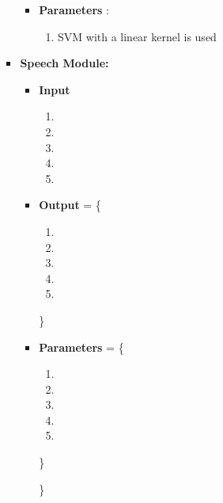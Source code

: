 \documentclass[oneside,a4paper,12pt]{report}
\begin{document}
\begin{normalsize}
\begin{itemize}
\begin{itemize}
\begin{itemize}
\begin{itemize}
			\item \textbf{Parameters} :
			\begin{enumerate}
			\item SVM with a linear kernel is used 
			\end{enumerate} 
		\end{itemize}
		\vspace{10mm}
		\item \textbf{Speech Module: }
	\begin{itemize}
		\item \textbf{Input} 
		\begin{enumerate}
			\item 
			\item
			\item
			\item
			\item
		\end{enumerate}
		
		\item \textbf{Output} = \{ 
		\begin{enumerate}
			\item 
			\item
			\item
			\item
			\item
		\end{enumerate}  \}
		
		\item \textbf{Parameters} = \{ 
		\begin{enumerate}
			\item 
			\item
			\item
			\item
			\item
		\end{enumerate}  \}
		
		\}
	\end{itemize}
	\end{itemize}
		

\end{itemize}
\end{itemize}
\end{normalsize}
\end{document}
